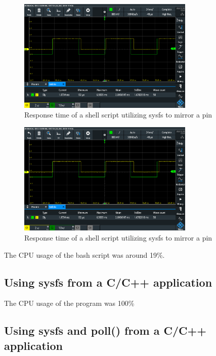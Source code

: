 \documentclass{article}
\begin{document}
\begin{figure}[H]
    \centering
    \includegraphics[width=0.75\textwidth]{Project4KernelSpaceEncoderDriver/part2_shell_mirror.PNG}
    \caption{Response time of a shell script utilizing sysfs to mirror a pin}
    \label{fig:shell}
\end{figure}

\begin{figure}[H]
    \centering
    \includegraphics[width=0.75\textwidth]{Project4KernelSpaceEncoderDriver/part2_shell_mirror.PNG}
    \caption{Response time of a shell script utilizing sysfs to mirror a pin}
    \label{fig:shell}
\end{figure}



The CPU usage of the bash script was around 19\%.

\subsection{Using sysfs from a C/C++ application}

The CPU usage of the program was 100\%

\subsection{Using sysfs and poll() from a C/C++ application}
\end{document}
